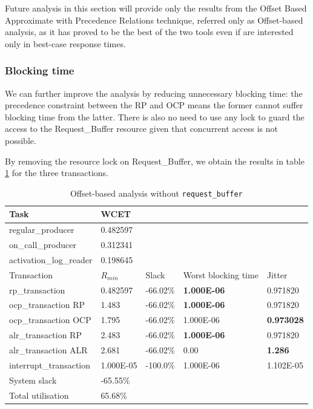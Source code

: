 \documentclass{article}
\begin{document}
Future analysis in this section will provide only the results from the Offset Based Approximate with Precedence Relations technique, referred only as Offset-based analysis, as it has proved to be the best of the two tools even if are interested only in best-case response times.

\subsubsection{Blocking time}

We can further improve the analysis by reducing unnecessary blocking time: the precedence constraint between the RP and OCP means the former cannot suffer blocking time from the latter. There is also no need to use any lock to guard the access to the Request\_Buffer resource given that concurrent access is not possible.

By removing the resource lock on Request\_Buffer, we obtain the results in table \ref{tab:off-approx-w-pr-blocking-time} for the three transactions.

\begin{table}[!htbp]
   \centering
   \begin{tabular}{lllll}
    \toprule
    Task & WCET \\
    \midrule
    regular\_producer & 0.482597 \\
    on\_call\_producer & 0.312341 \\
    activation\_log\_reader & 0.198645 \\
    \toprule
    \toprule
    Transaction & $R_{min}$ & Slack & Worst blocking time & Jitter \\
    \midrule
    rp\_transaction & 0.482597 & -66.02\% &  \textbf{1.000E-06} & 0.971820 \\
    ocp\_transaction RP & 1.483 & -66.02\% & \textbf{1.000E-06} & 0.971820 \\
    ocp\_transaction OCP & 1.795 & -66.02\% & 1.000E-06 & \textbf{0.973028} \\
    alr\_transaction RP & 2.483 & -66.02\% & \textbf{1.000E-06} & 0.971820 \\
    alr\_transaction ALR & 2.681 & -66.02\% & 0.00 & \textbf{1.286} \\
    interrupt\_transaction & 1.000E-05 & -100.0\% & 1.000E-06 & 1.102E-05 \\
    \toprule
    \toprule
    System slack & -65.55\% \\
    Total utilisation & 65.68\% \\
   \end{tabular}
   \caption{Offset-based analysis without \texttt{request\_buffer}}
   \label{tab:off-approx-w-pr-blocking-time}
 \end{table}
\end{document}
